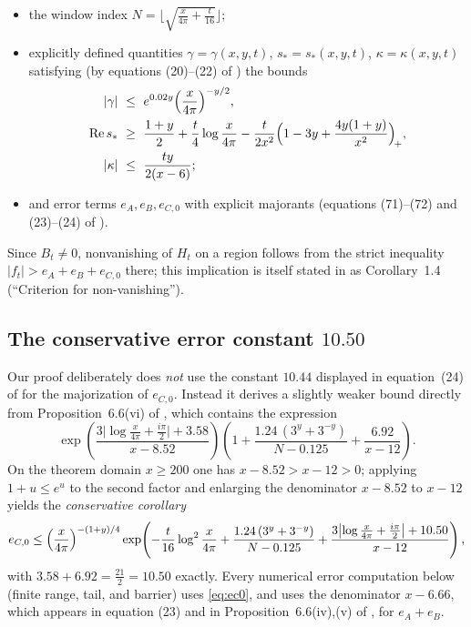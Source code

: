 \documentclass[11pt]{article}
\theoremstyle{definition}
\DeclareMathOperator{\Rea}{Re}
\begin{document}
\begin{itemize}
\item the window index
$N=\bigl\lfloor\sqrt{\tfrac{x}{4\pi}+\tfrac{t}{16}}\bigr\rfloor$;
\item explicitly defined quantities $\gamma=\gamma(x,y,t)$,
$s_*=s_*(x,y,t)$, $\kappa=\kappa(x,y,t)$ satisfying (by equations
(20)--(22) of \cite{Polymath}) the bounds
\begin{align}
|\gamma|&\ \le\ e^{0.02y}\Bigl(\frac{x}{4\pi}\Bigr)^{-y/2},
\label{eq:gammabound}\\
\Rea s_*&\ \ge\ \frac{1+y}{2}+\frac t4\log\frac{x}{4\pi}
-\frac{t}{2x^2}\Bigl(1-3y+\frac{4y(1+y)}{x^2}\Bigr)_{\!+},
\label{eq:resbound}\\
|\kappa|&\ \le\ \frac{ty}{2(x-6)};
\label{eq:kappabound}
\end{align}
\item and error terms $e_A,e_B,e_{C,0}$ with explicit majorants
(equations (71)--(72) and (23)--(24) of \cite{Polymath}).
\end{itemize}
Since $B_t\ne0$, nonvanishing of $H_t$ on a region follows from the
strict inequality $|f_t|>e_A+e_B+e_{C,0}$ there; this implication is
itself stated in \cite{Polymath} as Corollary~1.4 (``Criterion for
non-vanishing'').

\subsection{The conservative error constant $10.50$}\label{sec:weld}

Our proof deliberately does \emph{not} use the constant $10.44$
displayed in equation~(24) of \cite{Polymath} for the majorization of
$e_{C,0}$.
Instead it derives a
slightly weaker bound directly from Proposition~6.6(vi) of
\cite{Polymath}, which contains the expression
\[
\exp\!\left(\frac{3\bigl|\log\frac{x}{4\pi}+\frac{i\pi}2\bigr|+3.58}{x-8.52}\right)
\left(1+\frac{1.24\,(3^y+3^{-y})}{N-0.125}+\frac{6.92}{x-12}\right).
\]
On the theorem domain $x\ge200$ one has $x-8.52>x-12>0$; applying
$1+u\le e^u$ to the second factor and enlarging the denominator
$x-8.52$ to $x-12$ yields the \emph{conservative corollary}
\begin{equation}\label{eq:ec0}
e_{C,0}\le
\Bigl(\frac{x}{4\pi}\Bigr)^{-(1+y)/4}
\exp\!\left(
-\frac{t}{16}\log^2\frac{x}{4\pi}
+\frac{1.24\,(3^y+3^{-y})}{N-0.125}
+\frac{3\bigl|\log\frac{x}{4\pi}+\frac{i\pi}2\bigr|+10.50}{x-12}
\right),
\end{equation}
with $3.58+6.92=\tfrac{21}2=10.50$ exactly. Every numerical error
computation below (finite range, tail, and barrier) uses
\eqref{eq:ec0}, and uses the denominator $x-6.66$, which appears in
equation (23) and in Proposition~6.6(iv),(v) of \cite{Polymath}, for
$e_A+e_B$.
\end{document}

